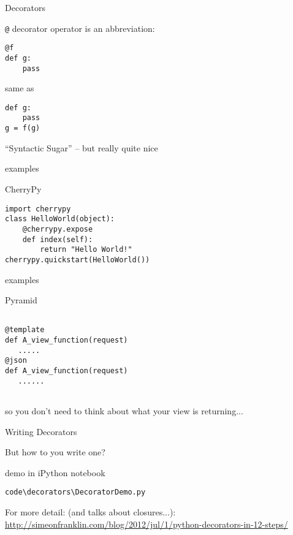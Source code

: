 \documentclass{beamer}
\begin{document}
\begin{frame}[fragile]{Decorators}

{\LARGE \verb|@| decorator operator is an abbreviation:}

\vfill
\begin{verbatim}
@f
def g:
    pass
\end{verbatim}

\vfill
same as

\vfill
\begin{verbatim}
def g:
    pass
g = f(g)
\end{verbatim}

\vfill
{\Large ``Syntactic Sugar'' -- but really quite nice}

\end{frame} 


\begin{frame}[fragile]{examples}

{\LARGE CherryPy}

\vfill
\begin{verbatim}
import cherrypy
class HelloWorld(object):
    @cherrypy.expose
    def index(self):
        return "Hello World!"
cherrypy.quickstart(HelloWorld())
\end{verbatim}

\end{frame} 

\begin{frame}[fragile]{examples}

{\LARGE Pyramid}

\vfill
\begin{verbatim}

@template
def A_view_function(request)
   .....
@json
def A_view_function(request)
   ......


\end{verbatim}

so you don't need to think about what your view is returning...

\end{frame} 

\begin{frame}[fragile]{Writing Decorators}

{\LARGE But how to you write one?}

\vfill
{\Large
demo in iPython notebook

\vfill
\begin{verbatim}
code\decorators\DecoratorDemo.py
\end{verbatim}
}

\vfill
{\large For more detail: (and talks about closures...):}\\

\url{http://simeonfranklin.com/blog/2012/jul/1/python-decorators-in-12-steps/}

\end{frame} 
\end{document}
